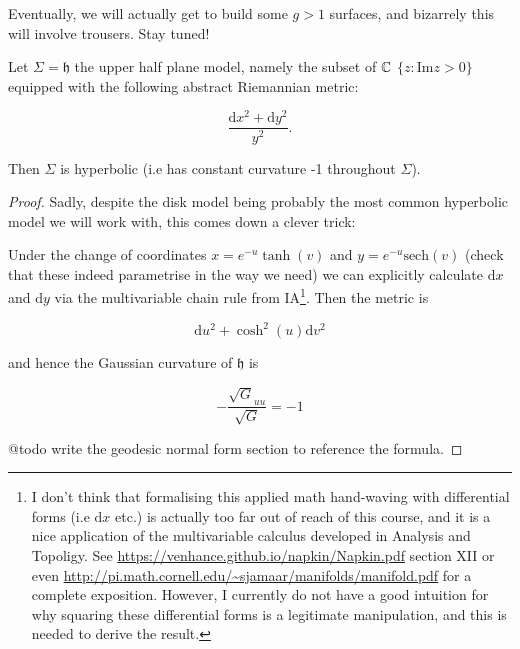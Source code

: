 \documentclass[11pt]{scrartcl}
\begin{document}
Eventually, we will actually get to build some $g > 1$ surfaces, and bizarrely this will involve trousers. Stay tuned!

\begin{proposition}
Let $\Sigma = \mathfrak{h}$ the upper half plane model, namely the subset of $\mathbb C$ $\{ z : \text{Im}z > 0 \}$ equipped with the following abstract Riemannian metric:

\begin{equation}
    \frac{\mathrm{d}x^2 + \mathrm{d}y^2}{y^2}.
\end{equation}

Then $\Sigma$ is hyperbolic (i.e has constant curvature -1 throughout 
 $\Sigma$).
 
 \begin{proof}
 Sadly, despite the disk model being probably the most common hyperbolic model we will work with, this comes down a clever trick:
 
 Under the change of coordinates $x = e^{-u} \tanh (v)$ and $y = e^{-u} \text{sech} (v)$ (check that these indeed parametrise in the way we need) we can explicitly calculate $\mathrm{d}x$ and $\mathrm{d}y$ via the multivariable chain rule from IA\footnote{I don't think that formalising this applied math hand-waving with differential forms (i.e $\mathrm{d}x$ etc.) is actually too far out of reach of this course, and it is a nice application of the multivariable calculus developed in Analysis and Topoligy. See \url{https://venhance.github.io/napkin/Napkin.pdf} section XII or even \url{http://pi.math.cornell.edu/~sjamaar/manifolds/manifold.pdf} for a complete exposition. However, I currently do not have a good intuition for why squaring these differential forms is a legitimate manipulation, and this is needed to derive the result.}. Then the metric is
 
 \begin{equation}
     \mathrm{d}u^2 + \cosh^2 (u) \mathrm{d}v^2
 \end{equation}
 
 and hence the Gaussian curvature of $\mathfrak{h}$ is 
 
 \begin{equation}
     - \frac{\sqrt{G}_{uu}}{\sqrt{G}} = -1
 \end{equation}
 
 @todo write the geodesic normal form section to reference the formula.
 
 \end{proof}
 \end{proposition}
\end{document}
